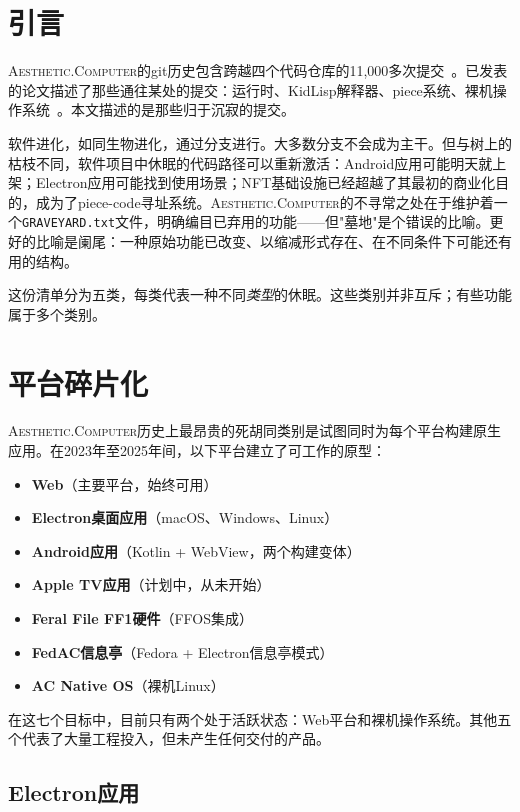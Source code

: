 \documentclass[10pt,letterpaper,twocolumn]{article}
\newcommand{\ac}{\textsc{Aesthetic.Computer}}
\begin{document}
\section{引言}

\ac{}的git历史包含跨越四个代码仓库的11,000多次提交~\citep{scudder2026archaeology}。已发表的论文描述了那些通往某处的提交：运行时、KidLisp解释器、piece系统、裸机操作系统~\citep{scudder2026ac, scudder2026os}。本文描述的是那些归于沉寂的提交。

软件进化，如同生物进化，通过分支进行。大多数分支不会成为主干。但与树上的枯枝不同，软件项目中休眠的代码路径可以重新激活：Android应用可能明天就上架；Electron应用可能找到使用场景；NFT基础设施已经超越了其最初的商业化目的，成为了piece-code寻址系统。\ac{}的不寻常之处在于维护着一个\texttt{GRAVEYARD.txt}文件，明确编目已弃用的功能——但"墓地"是个错误的比喻。更好的比喻是阑尾：一种原始功能已改变、以缩减形式存在、在不同条件下可能还有用的结构。

这份清单分为五类，每类代表一种不同\emph{类型}的休眠。这些类别并非互斥；有些功能属于多个类别。

\section{平台碎片化}
\label{sec:fragmentation}

\ac{}历史上最昂贵的死胡同类别是试图同时为每个平台构建原生应用。在2023年至2025年间，以下平台建立了可工作的原型：

\begin{itemize}
  \item \textbf{Web}（主要平台，始终可用）
  \item \textbf{Electron桌面应用}（macOS、Windows、Linux）
  \item \textbf{Android应用}（Kotlin + WebView，两个构建变体）
  \item \textbf{Apple TV应用}（计划中，从未开始）
  \item \textbf{Feral File FF1硬件}（FFOS集成）
  \item \textbf{FedAC信息亭}（Fedora + Electron信息亭模式）
  \item \textbf{AC Native OS}（裸机Linux）
\end{itemize}

在这七个目标中，目前只有两个处于活跃状态：Web平台和裸机操作系统。其他五个代表了大量工程投入，但未产生任何交付的产品。

\subsection{Electron应用}
\end{document}
